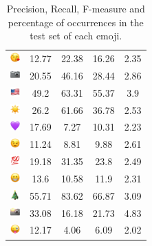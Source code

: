 \documentclass{article}
\begin{document}
\begin{table}
\begin{tabular}{|c|ccc|c|}
\includegraphics[height=0.37cm,width=0.37cm]{img/face_blowing_a_kiss.png} & 12.77 & 22.38 & 16.26 & 2.35\\ 
\includegraphics[height=0.37cm,width=0.37cm]{img/camera.png} & 20.55 & 46.16 & 28.44 & 2.86\\ 
\includegraphics[height=0.37cm,width=0.37cm]{img/United_States.png} & 49.2 & 63.31 & 55.37 & 3.9\\ 
\includegraphics[height=0.37cm,width=0.37cm]{img/sun.png} & 26.2 & 61.66 & 36.78 & 2.53\\ 
\includegraphics[height=0.37cm,width=0.37cm]{img/purple_heart.png} & 17.69 & 7.27 & 10.31 & 2.23\\ 
\includegraphics[height=0.37cm,width=0.37cm]{img/winking_face.png} & 11.24 & 8.81 & 9.88 & 2.61\\ 
\includegraphics[height=0.37cm,width=0.37cm]{img/hundred_points.png} & 19.18 & 31.35 & 23.8 & 2.49\\ 
\includegraphics[height=0.37cm,width=0.37cm]{img/beaming_face_with_smiling_eyes.png} & 13.6 & 10.58 & 11.9 & 2.31\\ 
\includegraphics[height=0.37cm,width=0.37cm]{img/Christmas_tree.png} & 55.71 & 83.62 & 66.87 & 3.09\\ 
\includegraphics[height=0.37cm,width=0.37cm]{img/camera_with_flash.png} & 33.08 & 16.18 & 21.73 & 4.83\\ 
\includegraphics[height=0.37cm,width=0.37cm]{img/winking_face_with_tongue.png} & 12.17 & 4.06 & 6.09 & 2.02\\ 

\hline
\end{tabular}
\caption{\label{table:emoji_detailed} Precision, Recall, F-measure and percentage of occurrences in the test set of each emoji.}
\end{table}
\end{document}
